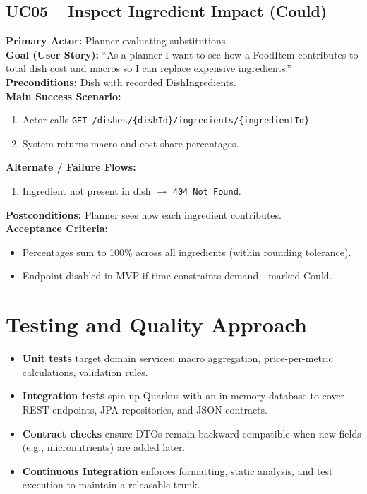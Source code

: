 \documentclass[11pt]{article}
\begin{document}
\subsection*{UC05 -- Inspect Ingredient Impact (Could)}
\textbf{Primary Actor:} Planner evaluating substitutions.\\
\textbf{Goal (User Story):} ``As a planner I want to see how a FoodItem contributes to total dish cost and macros so I can replace expensive ingredients.''\\
\textbf{Preconditions:} Dish with recorded DishIngredients.\\
\textbf{Main Success Scenario:}
\begin{enumerate}[label=\arabic*.]
  \item Actor calls \texttt{GET /dishes/\{dishId\}/ingredients/\{ingredientId\}}.
  \item System returns macro and cost share percentages.
\end{enumerate}
\textbf{Alternate / Failure Flows:}
\begin{enumerate}[label=\arabic*F.]
  \item Ingredient not present in dish $\rightarrow$ \texttt{404 Not Found}.
\end{enumerate}
\textbf{Postconditions:} Planner sees how each ingredient contributes.\\
\textbf{Acceptance Criteria:}
\begin{itemize}[noitemsep]
  \item Percentages sum to 100\% across all ingredients (within rounding tolerance).
  \item Endpoint disabled in MVP if time constraints demand---marked Could.
\end{itemize}

\section{Testing and Quality Approach}

\begin{itemize}[noitemsep]
  \item \textbf{Unit tests} target domain services: macro aggregation, price-per-metric calculations, validation rules.
  \item \textbf{Integration tests} spin up Quarkus with an in-memory database to cover REST endpoints, JPA repositories, and JSON contracts.
  \item \textbf{Contract checks} ensure DTOs remain backward compatible when new fields (e.g., micronutrients) are added later.
  \item \textbf{Continuous Integration} enforces formatting, static analysis, and test execution to maintain a releasable trunk.
\end{itemize}
\end{document}
